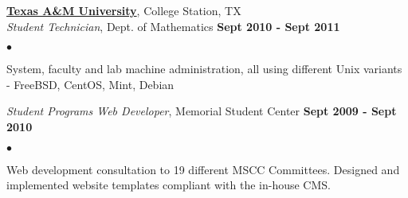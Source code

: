 \documentclass[margin,line]{res}
\newenvironment{list2}
  {\vspace{-4mm}
   \begin{list}{$\bullet$}{
     \setlength{\itemsep}{0in}
     \setlength{\parsep}{0in} \setlength{\parskip}{0in}
     \setlength{\topsep}{0in} \setlength{\partopsep}{0in}
     \setlength{\leftmargin}{0.18in}}}
  {\end{list}}
\begin{document}
\begin{resume}
{\bf \href{http://tamu.edu}{Texas A\&M University}}, College Station, TX \\
{\em Student Technician}, Dept. of Mathematics                    \hfill {\bf Sept 2010 - Sept 2011} \\
\begin{list2}
\item System, faculty and lab machine administration, all using different Unix variants - FreeBSD, CentOS, Mint, Debian
\end{list2}

{\em Student Programs Web Developer}, Memorial Student Center     \hfill {\bf Sept 2009 - Sept 2010} \\
\begin{list2}
\item Web development consultation to 19 different MSCC Committees. Designed and implemented website templates compliant with the in-house CMS.
\end{list2}


%
%

\end{resume}
\end{document}
